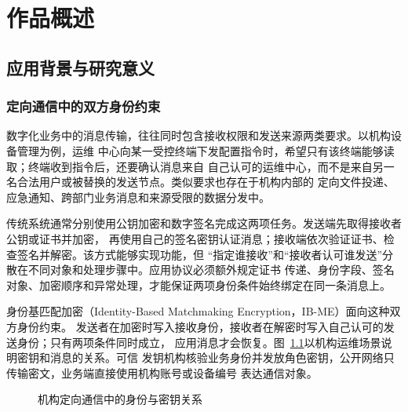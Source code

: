 \chapter{作品概述}

\section{应用背景与研究意义}

\subsection{定向通信中的双方身份约束}

数字化业务中的消息传输，往往同时包含接收权限和发送来源两类要求。以机构设备管理为例，运维
中心向某一受控终端下发配置指令时，希望只有该终端能够读取；终端收到指令后，还要确认消息来自
自己认可的运维中心，而不是来自另一名合法用户或被替换的发送节点。类似要求也存在于机构内部的
定向文件投递、应急通知、跨部门业务消息和来源受限的数据分发中。

传统系统通常分别使用公钥加密和数字签名完成这两项任务。发送端先取得接收者公钥或证书并加密，
再使用自己的签名密钥认证消息；接收端依次验证证书、检查签名并解密。该方式能够实现功能，但
“指定谁接收”和“接收者认可谁发送”分散在不同对象和处理步骤中。应用协议必须额外规定证书
传递、身份字段、签名对象、加密顺序和异常处理，才能保证两项身份条件始终绑定在同一条消息上。

身份基匹配加密（Identity-Based Matchmaking Encryption，IB-ME）面向这种双方身份约束。
发送者在加密时写入接收身份，接收者在解密时写入自己认可的发送身份；只有两项条件同时成立，
应用消息才会恢复。图~\ref{fig:application-background}以机构运维场景说明密钥和消息的关系。可信
发钥机构核验业务身份并发放角色密钥，公开网络只传输密文，业务端直接使用机构账号或设备编号
表达通信对象。

\begin{figure}[H]
\centering
{}
\caption{机构定向通信中的身份与密钥关系}
\label{fig:application-background}
\end{figure}


